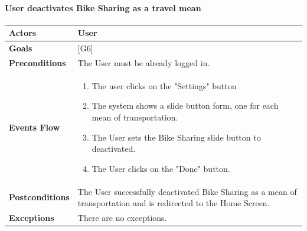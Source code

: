 \documentclass[12pt]{article}
\begin{document}
\newpage

\paragraph{User deactivates Bike Sharing as a travel mean}
\begin{center}
    \begin{tabular} { |p{}|p{}| }
        \hline
        \textbf{Actors} & User \\ 
        \hline
        \textbf{Goals} & {[G6]} \\ 
        \hline  
        \textbf{Preconditions} & The User must be already logged in. \\ 
        \hline
        \textbf{Events Flow} & \begin{enumerate}[topsep=0pt] 
                            \setlength{\itemsep}{0.5pt}
                            \item The user clicks on the "Settings" button
                            \item The system shows a slide button form, one for each mean of transportation.
                            \item The User sets the Bike Sharing slide button to deactivated.
                            \item The User clicks on the "Done" button.
                            \end{enumerate} \\
        \hline
        \textbf{Postconditions} & The User successfully deactivated Bike Sharing as a mean of transportation and is redirected to the Home Screen. \\
        \hline
        \textbf{Exceptions} & There are no exceptions.\\ 
        \hline
     \end{tabular}
\end{center}
\end{document}
